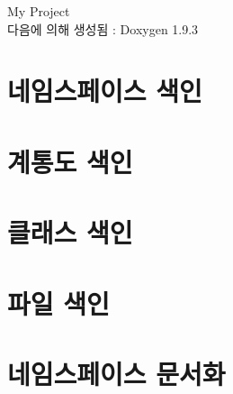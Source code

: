 \documentclass[twoside]{book}
\newcommand{\+}{\discretionary{\mbox{\scriptsize$\hookleftarrow$}}{}{}}
\newcommand{\clearemptydoublepage}{%
    \newpage{\pagestyle{empty}\cleardoublepage}%
  }
\begin{document}
  \raggedbottom
    \hypersetup{pageanchor=false,
                bookmarksnumbered=true,
                pdfencoding=unicode
               }
  \begin{titlepage}
  \vspace*{7cm}
  \begin{center}%
  {\Large My Project}\\
  \vspace*{1cm}
  {\large 다음에 의해 생성됨 \+:  Doxygen 1.9.3}\\
  \end{center}
  \end{titlepage}
  \clearemptydoublepage
  \tableofcontents
  \clearemptydoublepage
  \hypersetup{pageanchor=true}
\chapter{네임스페이스 색인}

\chapter{계통도 색인}

\chapter{클래스 색인}

\chapter{파일 색인}

\chapter{네임스페이스 문서화}





\end{document}
